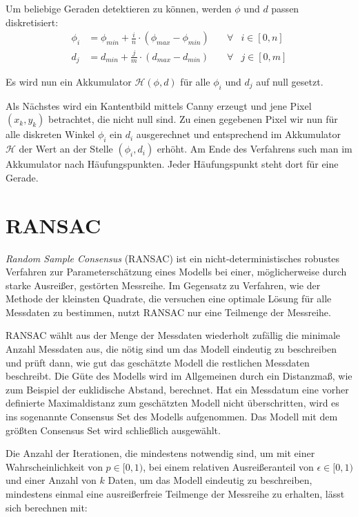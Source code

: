 Um beliebige Geraden detektieren zu können, werden $\phi$ und $d$ passen diskretisiert:
\begin{equation*}
	\begin{aligned}
		\phi_i &= \phi_{min} + \frac{i}{n} \cdot (\phi_{max} - \phi_{min}) \quad&\forall &i\in [0,n]\\
		d_j &= d_{min} + \frac{j}{m} \cdot  (d_{max} - d_{min}) &\forall &j\in [0,m]
	\end{aligned}
\end{equation*}

Es wird nun ein Akkumulator $\mathcal{H}(\phi, d)$ für alle $\phi_i$ und $d_j$ auf null gesetzt.

Als Nächstes wird ein Kantentbild mittels Canny erzeugt und jene Pixel $(x_k,y_k)$ betrachtet, die nicht null sind.
Zu einen gegebenen Pixel wir nun für alle diskreten Winkel $\phi_i$ ein $d_i$ ausgerechnet und entsprechend im Akkumulator  $\mathcal{H}$ der Wert an der Stelle $(\phi_i, d_i)$ erhöht. 
Am Ende des Verfahrens such man im Akkumulator nach Häufungspunkten. Jeder Häufungspunkt steht dort für eine Gerade. 


\section{RANSAC}
\label{s:ransac}
\textit{Random Sample Consensus} (RANSAC) \cite{Fischler1981} ist ein nicht-deterministisches robustes Verfahren zur Parameterschätzung eines Modells bei einer, möglicherweise durch starke Ausreißer, gestörten Messreihe. 
Im Gegensatz zu Verfahren, wie der Methode der kleinsten Quadrate, die versuchen eine optimale Lösung für alle Messdaten zu bestimmen, nutzt RANSAC nur eine Teilmenge der Messreihe. 

RANSAC wählt aus der Menge der Messdaten wiederholt zufällig die minimale Anzahl Messdaten aus, die nötig sind um das Modell eindeutig zu beschreiben und prüft dann, wie gut das geschätzte Modell die restlichen Messdaten beschreibt. 
Die Güte des Modells wird im Allgemeinen durch ein Distanzmaß, wie zum Beispiel der euklidische Abstand, berechnet. 
Hat ein Messdatum eine vorher definierte Maximaldistanz zum geschätzten Modell nicht überschritten, wird es ins sogenannte Consensus Set des Modells aufgenommen. 
Das Modell mit dem größten Consensus Set wird schließlich ausgewählt. 

Die Anzahl der Iterationen, die mindestens notwendig sind, um mit einer Wahrscheinlichkeit von $p \in [0,1)$, bei einem relativen Ausreißeranteil von $\epsilon \in[0,1)$ und einer Anzahl von $k$ Daten, um das Modell eindeutig zu beschreiben, mindestens einmal eine ausreißerfreie Teilmenge der Messreihe zu erhalten, lässt sich berechnen mit:

